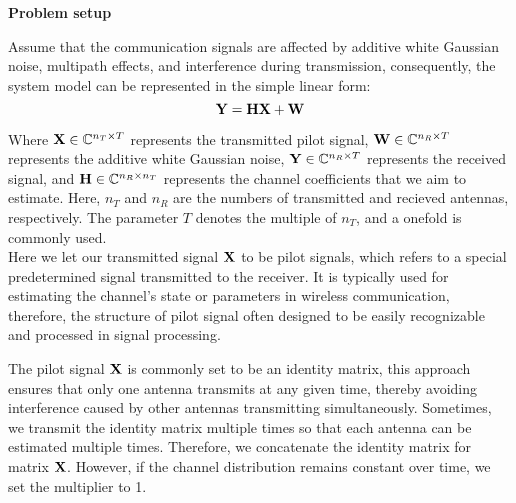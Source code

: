 \documentclass[a4paper, onecolumn, 11pt]{IEEEtran}
\begin{document}
    \noindent \textbf{Problem setup}
    
        Assume that the communication signals are affected by additive white Gaussian noise, multipath effects, and interference during transmission, consequently,
        the system model can be represented in the simple linear form:
        \begin{equation} \label{eq:sysModel}
            {\bf Y} = {\bf H}{\bf X} + {\bf W}
        \end{equation}

        Where ${\bf X} \in \mathbb{C}^{n_T \times T}$ represents the transmitted pilot signal, ${\bf W} \in \mathbb{C}^{n_R \times T}$ represents the additive white Gaussian noise, 
        ${\bf Y} \in \mathbb{C}^{n_R \times T}$ represents the received signal, and ${\bf H} \in \mathbb{C}^{n_R \times n_T}$ represents the channel coefficients
        that we aim to estimate. Here, $n_T$ and $n_R$ are the numbers of transmitted and recieved antennas, respectively. The parameter $T$ denotes the multiple of $n_T$, 
        and a onefold is commonly used.\\

        Here we let our transmitted signal ${\bf X}$ to be pilot signals, which refers to a special predetermined signal transmitted to the receiver. 
        It is typically used for estimating the channel's state or parameters in wireless communication, therefore,
        the structure of pilot signal often designed to be easily recognizable and processed in signal processing. 

        The pilot signal ${\bf X}$ is commonly set to be an identity matrix, this approach ensures that only one antenna transmits at any given time, thereby avoiding 
        interference caused by other 
        antennas transmitting simultaneously. Sometimes, we transmit the identity matrix multiple times so that each antenna can be estimated multiple times. Therefore, 
        we concatenate the identity matrix for matrix ${\bf X}$. However, if the channel distribution remains constant over time, we set the multiplier to 1.\\
\end{document}
